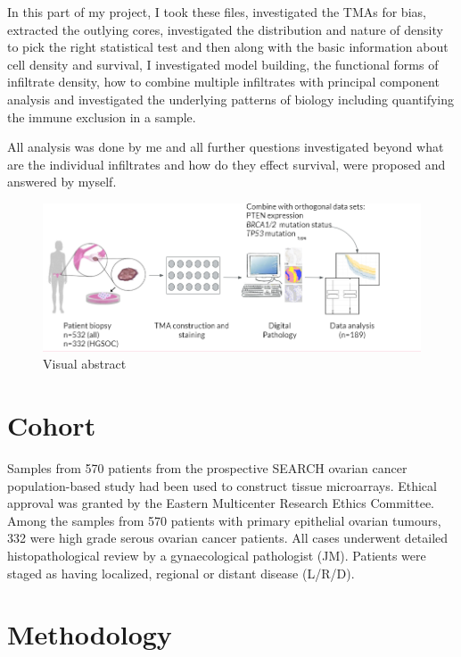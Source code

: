 In this part of my project, I took these files, investigated the TMAs for bias, extracted the outlying cores, investigated the distribution and nature of density to pick the right statistical test and then along with the basic information about cell density and survival, I investigated model building, the functional forms of infiltrate density, how to combine multiple infiltrates with principal component analysis and investigated the underlying patterns of biology including quantifying the immune exclusion in a sample. 

All analysis was done by me and all further questions investigated beyond what are the individual infiltrates and how do they effect survival, were proposed and answered by myself.



\begin{figure}
    \centering
    \includegraphics{Chapter2/Figs/Raster/Thesis_visual_abstract.PNG}
    \caption[Visual Abstract]{Visual abstract}
    \label{fig:visual_abstract}
\end{figure}

\section{Cohort}

Samples from 570 patients from the prospective SEARCH ovarian cancer population-based study had been used to construct tissue microarrays. Ethical approval was granted by the Eastern Multicenter Research Ethics Committee. Among the samples from 570 patients with primary epithelial ovarian tumours, 332 were high grade serous ovarian cancer patients. All cases underwent detailed histopathological review by a gynaecological pathologist (JM). Patients were staged as having localized, regional or distant disease (L/R/D).

\section[Methods]{Methodology}
